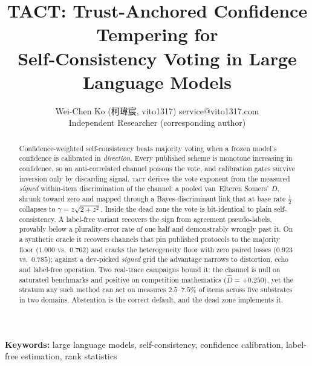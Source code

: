 \documentclass[twoside,11pt]{article}
\newcommand{\Dhat}{\widehat{D}}
\newcommand{\TACT}{\textsc{tact}}
\begin{document}
\title{TACT: Trust-Anchored Confidence Tempering for\\
       Self-Consistency Voting in Large Language Models}

\author{\name Wei-Chen Ko ({\zhfont 柯瑋宸}, vito1317) \email service@vito1317.com \\
        \addr Independent Researcher (corresponding author)}

\makeatletter
\def\@starteditor{}
\makeatother
\editor{}

\maketitle
\begin{abstract}
Confidence-weighted self-consistency beats majority voting when a frozen
model's confidence is calibrated in \emph{direction}. Every published scheme is monotone increasing in confidence, so an
anti-correlated channel poisons the vote, and calibration gates survive
inversion only by discarding signal. \TACT{} derives the vote exponent from the measured
\emph{signed} within-item discrimination of the channel: a pooled
van~Elteren Somers' $D$, shrunk toward zero and mapped through a
Bayes-discriminant link that at base rate $\tfrac12$ collapses to
$\gamma=z\sqrt{2+z^2}$. Inside the dead zone the vote is
bit-identical to plain self-consistency. A label-free variant recovers the sign from agreement pseudo-labels, provably
below a plurality-error rate of one half and demonstrably wrongly past it. On a synthetic oracle it recovers channels that pin published protocols to
the majority floor ($1.000$ vs.\ $0.762$) and cracks the
heterogeneity floor with zero paired losses ($0.923$ vs.\ $0.785$); against a
dev-picked \emph{signed} grid the advantage narrows to distortion, echo and
label-free operation. Two real-trace campaigns bound it: the channel is null on saturated
benchmarks and positive on competition mathematics ($\Dhat=+0.250$), yet the
stratum any such method can act on measures $2.5$--$7.5\%$ of items across five
substrates in two domains. Abstention is the correct default, and the dead zone
implements it.
\end{abstract}

\noindent\textbf{Keywords:} 
large language models, self-consistency, confidence calibration, label-free estimation, rank statistics
\end{document}
